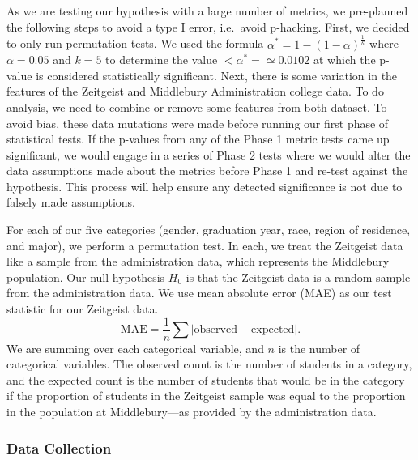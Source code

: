 \documentclass[
]{article}
\begin{document}
As we are testing our hypothesis with a large number of metrics, we
pre-planned the following steps to avoid a type I error, i.e.~avoid
p-hacking. First, we decided to only run permutation tests. We used the
formula \(\alpha^* = 1-(1-\alpha)^{\frac{1}{k}}\) where
\(\alpha = 0.05\) and \(k = 5\) to determine the value
\(<\alpha^* = \simeq 0.0102\) at which the p-value is considered
statistically significant. Next, there is some variation in the features
of the Zeitgeist and Middlebury Administration college data. To do
analysis, we need to combine or remove some features from both dataset.
To avoid bias, these data mutations were made before running our first
phase of statistical tests. If the p-values from any of the Phase 1
metric tests came up significant, we would engage in a series of Phase 2
tests where we would alter the data assumptions made about the metrics
before Phase 1 and re-test against the hypothesis. This process will
help ensure any detected significance is not due to falsely made
assumptions.

For each of our five categories (gender, graduation year, race, region
of residence, and major), we perform a permutation test. In each, we
treat the Zeitgeist data like a sample from the administration data,
which represents the Middlebury population. Our null hypothesis \(H_0\)
is that the Zeitgeist data is a random sample from the administration
data. We use mean absolute error (MAE) as our test statistic for our
Zeitgeist data. \begin{equation*}
\text{MAE} = \frac{1}{n}\sum |\text{observed} - \text{expected}|.
\end{equation*} We are summing over each categorical variable, and \(n\)
is the number of categorical variables. The observed count is the number
of students in a category, and the expected count is the number of
students that would be in the category if the proportion of students in
the Zeitgeist sample was equal to the proportion in the population at
Middlebury---as provided by the administration data.

\hypertarget{data-collection}{%
\subsubsection{Data Collection}\label{data-collection}}
\end{document}
